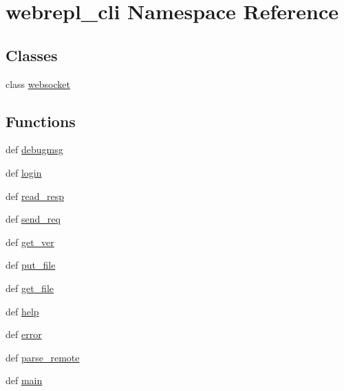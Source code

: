\hypertarget{namespacewebrepl__cli}{\section{webrepl\-\_\-cli Namespace Reference}
\label{namespacewebrepl__cli}
}
\subsection*{Classes}
\begin{DoxyCompactItemize}
\item 
class \hyperlink{classwebrepl__cli_1_1websocket}{websocket}
\end{DoxyCompactItemize}
\subsection*{Functions}
\begin{DoxyCompactItemize}
\item 
def \hyperlink{namespacewebrepl__cli_a020d1665a39f50bc8d10e14b2f198e28}{debugmsg}
\item 
def \hyperlink{namespacewebrepl__cli_a9aa0075f67d146fd85df3451dabbd90c}{login}
\item 
def \hyperlink{namespacewebrepl__cli_a3bbf9b1231428c8a685d3e5b409eceb3}{read\-\_\-resp}
\item 
def \hyperlink{namespacewebrepl__cli_a1085ccbb352f2cb56a3b19b7f69ca313}{send\-\_\-req}
\item 
def \hyperlink{namespacewebrepl__cli_add3f9367413335069ab9940fec88438e}{get\-\_\-ver}
\item 
def \hyperlink{namespacewebrepl__cli_a1f013fe2d584eff911b0bb16e414bc3d}{put\-\_\-file}
\item 
def \hyperlink{namespacewebrepl__cli_a497a141c77d94cb53d9939b8cb546365}{get\-\_\-file}
\item 
def \hyperlink{namespacewebrepl__cli_ac95bdd0f143f0b55b75f66c261b6083c}{help}
\item 
def \hyperlink{namespacewebrepl__cli_a1815136b236f0b612699a50491ba3a01}{error}
\item 
def \hyperlink{namespacewebrepl__cli_ace844f2e2fc5b64c134887d7981c9718}{parse\-\_\-remote}
\item 
def \hyperlink{namespacewebrepl__cli_abbf6f43f94666fbba1a31155719aedbf}{main}
\end{DoxyCompactItemize}
